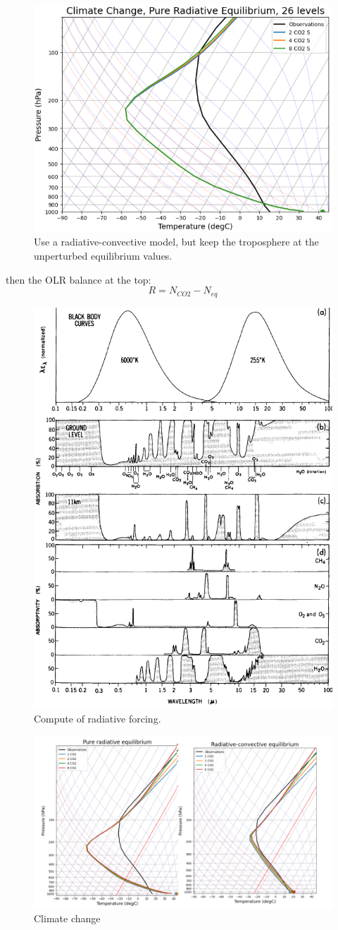 \begin{figure}[h!]
	\centering
	\includegraphics[width=0.5\linewidth]{uploads/Screenshot 2024-11-24 201309.png}
	\caption{Use a radiative-convective model, but keep the troposphere at the unperturbed equilibrium values.}
	\label{fig:enter-label}
\end{figure}
then the OLR balance at the top:
$$R=N_{CO2}-N_{eq}$$
\begin{figure}
	\centering
	\includegraphics[width=0.5\linewidth]{uploads/image11.png}
	\caption{Compute of radiative forcing.}
	\label{fig:enter-label}
\end{figure}
\begin{figure}[h!]
	\centering
	\includegraphics[width=0.5\linewidth]{uploads/Screenshot 2024-11-24 202614.png}
	\caption{Climate change}
	\label{fig:enter-label}
\end{figure}
